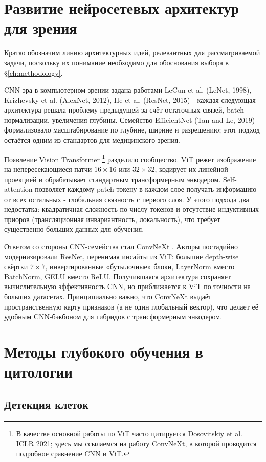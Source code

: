 \documentclass[14pt,a4paper]{extreport}
\begin{document}
\section{Развитие нейросетевых архитектур для зрения}

Кратко обозначим линию архитектурных идей, релевантных для
рассматриваемой задачи, поскольку их понимание необходимо для обоснования
выбора в \S\ref{ch:methodology}.

CNN-эра в компьютерном зрении задана работами LeCun et al. (LeNet, 1998),
Krizhevsky et al. (AlexNet, 2012), He et al. (ResNet, 2015) - каждая
следующая архитектура решала проблему предыдущей за счёт остаточных
связей, batch-нормализации, увеличения глубины. Семейство EfficientNet
(Tan and Le, 2019) формализовало масштабирование по глубине, ширине и
разрешению; этот подход остаётся одним из стандартов для медицинского
зрения.

Появление Vision Transformer \cite{liu2022convnext}\footnote{В качестве
основной работы по ViT часто цитируется Dosovitskiy et al. ICLR 2021;
здесь мы ссылаемся на работу ConvNeXt, в которой проводится подробное
сравнение CNN и ViT.} разделило сообщество. ViT режет изображение на
непересекающиеся патчи $16 \times 16$ или $32 \times 32$, кодирует их
линейной проекцией и обрабатывает стандартным трансформерным энкодером.
Self-attention позволяет каждому patch-токену в каждом слое получать
информацию от всех остальных - глобальная связность с первого слоя.
У этого подхода два недостатка: квадратичная сложность по числу токенов
и отсутствие индуктивных приоров (трансляционная инвариантность,
локальность), что требует существенно больших данных для обучения.

Ответом со стороны CNN-семейства стал ConvNeXt \cite{liu2022convnext}.
Авторы постадийно модернизировали ResNet, перенимая инсайты из ViT:
большие depth-wise свёртки $7 \times 7$, инвертированные «бутылочные»
блоки, LayerNorm вместо BatchNorm, GELU вместо ReLU. Получившаяся
архитектура сохраняет вычислительную эффективность CNN, но приближается
к ViT по точности на больших датасетах. Принципиально важно, что ConvNeXt
выдаёт пространственную карту признаков (а не один глобальный вектор),
что делает её удобным CNN-бэкбоном для гибридов с трансформерным
энкодером.

\section{Методы глубокого обучения в цитологии}

\subsection{Детекция клеток}
\end{document}
